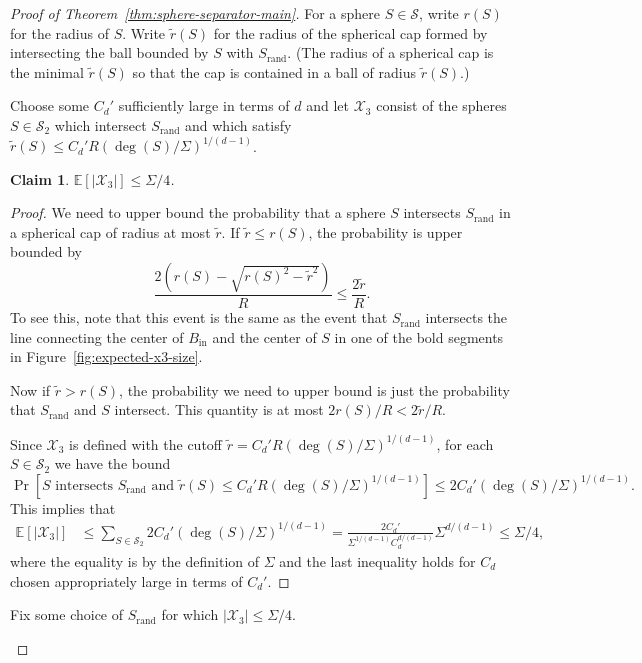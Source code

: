 \documentclass[11pt, reqno]{amsart}
\theoremstyle{plain}
\newtheorem{claim}[theorem]{Claim}
\theoremstyle{definition}
\theoremstyle{remark}
\numberwithin{theorem}{section}
\numberwithin{equation}{section}
\newcommand{\paren}[1]{\left( #1 \right)}
\newcommand{\E}{\mathbb E}
\newcommand{\fS}{\mathcal S}
\newcommand{\fX}{\mathcal X}
\begin{document}
\begin{proof}[Proof of Theorem~\ref{thm:sphere-separator-main}]
For a sphere $S\in\fS$, write $r(S)$ for the radius of $S$. Write $\tilde r(S)$ for the radius of the spherical cap formed by intersecting the ball bounded by $S$ with $S_{\mathrm{rand}}$. (The radius of a spherical cap is the minimal $\tilde r(S)$ so that the cap is contained in a ball of radius $\tilde r(S)$.)

Choose some $C_d'$ sufficiently large in terms of $d$ and let $\fX_3$ consist of the spheres $S\in \fS_2$ which intersect $S_{\mathrm{rand}}$ and which satisfy $\tilde r(S)\leq C_d' R(\deg(S)/\Sigma)^{1/(d-1)}$.

\begin{claim}
\label{claim:expected-x3-size}
$\E[|\fX_3|]\leq\Sigma/4$.
\end{claim}
\begin{proof}
We need to upper bound the probability that a sphere $S$ intersects $S_{\mathrm{rand}}$ in a spherical cap of radius at most $\tilde r$. If $\tilde r\leq r(S)$, the probability is upper bounded by 
\[\frac{2\paren{r(S)-\sqrt{r(S)^2-\tilde r^2}}}R\leq \frac{2\tilde r}{R}.\]
To see this, note that this event is the same as the event that $S_{\mathrm{rand}}$ intersects the line connecting the center of $B_{\mathrm{in}}$ and the center of $S$ in one of the bold segments in Figure~\ref{fig:expected-x3-size}.

Now if $\tilde r>r(S)$, the probability we need to upper bound is just the probability that $S_{\mathrm{rand}}$ and $S$ intersect. This quantity is at most $2r(S)/R<2\tilde r/R$. 

Since $\fX_3$ is defined with the cutoff $\tilde r = C_d' R(\deg(S)/\Sigma)^{1/(d-1)}$, for each $S\in\fS_2$ we have the bound
\[\Pr\left[S\text{ intersects }S_{\mathrm{rand}}\text{ and }\tilde r(S)\leq C_d' R(\deg(S)/\Sigma)^{1/(d-1)}\right]\leq 2C_d'(\deg(S)/\Sigma)^{1/(d-1)}.\]
This implies that
\begin{align*}
\E[|\fX_3|]
&\leq \sum_{S\in\fS_2} 2C_d'(\deg(S)/\Sigma)^{1/(d-1)}
=\frac{2C_d'}{\Sigma^{1/(d-1)}C_d^{d/(d-1)}}\Sigma^{d/(d-1)}
\leq \Sigma/4,
\end{align*}
where the equality is by the definition of $\Sigma$ and the last inequality holds for $C_d$ chosen appropriately large in terms of $C_d'$.
\end{proof}

Fix some choice of $S_{\mathrm{rand}}$ for which $|\fX_3|\leq\Sigma/4$. 

\begin{figure}
\centering
{}
\end{figure}
\end{proof}
\end{document}
